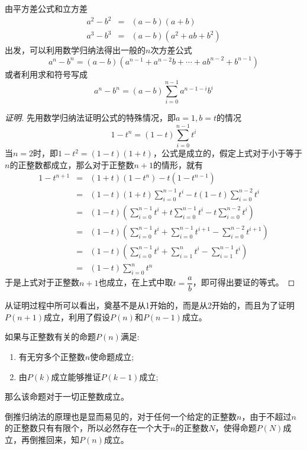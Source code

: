 \begin{example}
  \label{example:a-power-n-b-power-n-factoring}
  由平方差公式和立方差
  \begin{eqnarray*}
    a^2-b^2 & = & (a-b)(a+b) \\
    a^3-b^3 & = & (a-b)(a^2+ab+b^2)
  \end{eqnarray*}
  出发，可以利用数学归纳法得出一般的$n$次方差公式
  \[ a^n - b^n = (a-b)(a^{n-1}+a^{n-2}b+\cdots+ab^{n-2}+b^{n-1}) \]
  或者利用求和符号写成
  \[ a^n-b^n = (a-b)\sum_{i=0}^{n-1}a^{n-1-i}b^i \]
  \begin{proof}[证明]
    先用数学归纳法证明公式的特殊情况，即$a=1,b=t$的情况
    \[ 1-t^n = (1-t)\sum_{i=0}^{n-1}t^i \]
    当$n=2$时，即$1-t^2=(1-t)(1+t)$，公式是成立的，假定上式对于小于等于$n$的正整数都成立，那么对于正整数$n+1$的情形，就有
    \begin{eqnarray*}
      1-t^{n+1} & = & (1+t)(1-t^n)-t(1-t^{n-1}) \\
                & = & (1-t)(1+t)\sum_{i=0}^{n-1}t^i - t(1-t)\sum_{i=0}^{n-2}t^i \\
                & = & (1-t) \left( \sum_{i=0}^{n-1}t^i + t\sum_{i=0}^{n-1}t^i -t\sum_{i=0}^{n-2}t^i \right) \\
                & = & (1-t) \left( \sum_{i=0}^{n-1}t^i + \sum_{i=0}^{n-1}t^{i+1} -\sum_{i=0}^{n-2}t^{i+1} \right) \\
                & = & (1-t) \left( \sum_{i=0}^{n-1}t^i + \sum_{i=1}^{n}t^{i} -\sum_{i=1}^{n-1}t^{i} \right) \\
      & = & (1-t)\sum_{i=0}^nt^n
    \end{eqnarray*}
    于是上式对于正整数$n+1$也成立，在上式中取$t=\dfrac{a}{b}$，即可得出要证的等式。
  \end{proof}

  从证明过程中所可以看出，奠基不是从1开始的，而是从2开始的，而且为了证明$P(n+1)$成立，利用了假设$P(n)$和$P(n-1)$成立。
\end{example}

\begin{principle}[倒推归纳法]
如果与正整数有关的命题$P(n)$满足:
  \begin{enumerate}
  \item 有无穷多个正整数$n$使命题成立;
  \item 由$P(k)$成立能够推证$P(k-1)$成立;
  \end{enumerate}
那么该命题对于一切正整数成立。
\end{principle}
倒推归纳法的原理也是显而易见的，对于任何一个给定的正整数$n$，由于不超过$n$的正整数只有有限个，所以必然存在一个大于$n$的正整数$N$，使得命题$P(N)$成立，再倒推回来，知$P(n)$成立。

